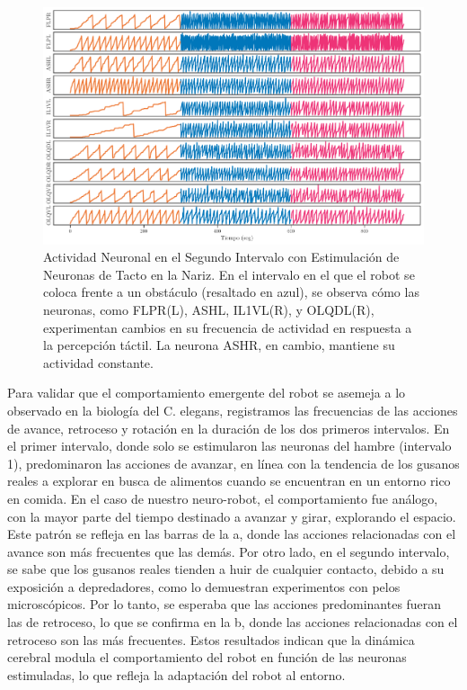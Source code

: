 \begin{figure}[h!]
	\centering\includegraphics[width=\imsize]{intervalos_nariz.pdf}
	\caption[    Actividad Neuronal en el Segundo Intervalo con Estimulación de Neuronas de Tacto en la Nariz.  ]{   Actividad Neuronal en el Segundo Intervalo con Estimulación de Neuronas de Tacto en la Nariz.  En el intervalo en el que el robot se coloca frente a un obstáculo (resaltado en azul), se observa cómo las neuronas, como FLPR(L), ASHL, IL1VL(R), y OLQDL(R), experimentan cambios en su frecuencia de actividad en respuesta a la percepción táctil. La neurona ASHR, en cambio, mantiene su actividad constante.}\label{fig:intervalos_nariz}
\end{figure}

Para validar que el comportamiento emergente del robot se asemeja a lo observado en la biología del C. elegans, registramos las frecuencias de las acciones de avance, retroceso y rotación en la duración de los dos primeros intervalos. En el primer intervalo, donde solo se estimularon las neuronas del hambre (intervalo 1), predominaron las acciones de avanzar, en línea con la tendencia de los gusanos reales a explorar en busca de alimentos cuando se encuentran en un entorno rico en comida. En el caso de nuestro neuro-robot, el comportamiento fue análogo, con la mayor parte del tiempo destinado a avanzar y girar, explorando el espacio. Este patrón se refleja en las barras de la a, donde las acciones relacionadas con el avance son más frecuentes que las demás. Por otro lado, en el segundo intervalo, se sabe que los gusanos reales tienden a huir de cualquier contacto, debido a su exposición a depredadores, como lo demuestran experimentos con pelos microscópicos. Por lo tanto, se esperaba que las acciones predominantes fueran las de retroceso, lo que se confirma en la b, donde las acciones relacionadas con el retroceso son las más frecuentes.  Estos resultados indican que la dinámica cerebral modula el comportamiento del robot en función de las neuronas estimuladas, lo que refleja la adaptación del robot al entorno.

